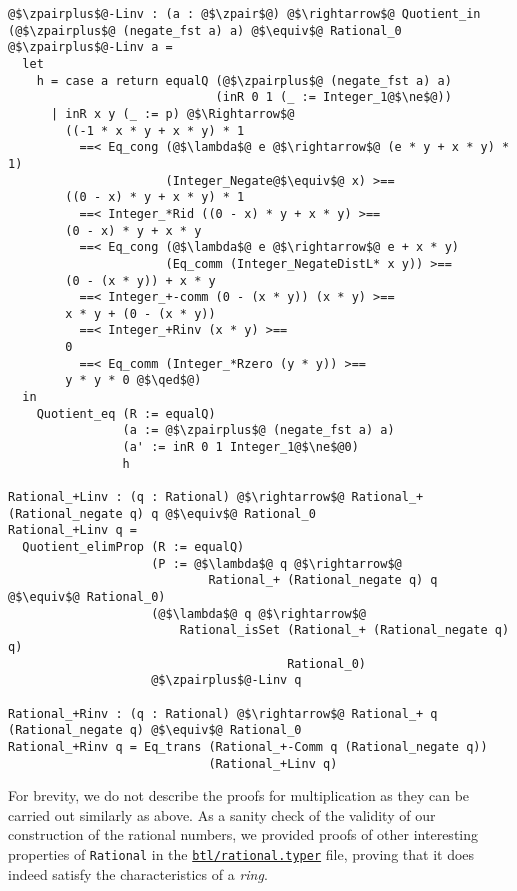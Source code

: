 \documentclass[12pt,twoside,maitrise]{dms}
\theoremstyle{definition}
\numberwithin{equation}{section}
\numberwithin{table}{chapter}
\numberwithin{figure}{chapter}
\newcommand\id[1] {\texttt{#1}}
\renewcommand\qed{\blacksquare}
\begin{document}
\begin{verbatim}
@$\zpairplus$@-Linv : (a : @$\zpair$@) @$\rightarrow$@ Quotient_in (@$\zpairplus$@ (negate_fst a) a) @$\equiv$@ Rational_0
@$\zpairplus$@-Linv a =
  let
    h = case a return equalQ (@$\zpairplus$@ (negate_fst a) a)
                             (inR 0 1 (_ := Integer_1@$\ne$@))
      | inR x y (_ := p) @$\Rightarrow$@
        ((-1 * x * y + x * y) * 1
          ==< Eq_cong (@$\lambda$@ e @$\rightarrow$@ (e * y + x * y) * 1)
                      (Integer_Negate@$\equiv$@ x) >==
        ((0 - x) * y + x * y) * 1
          ==< Integer_*Rid ((0 - x) * y + x * y) >==
        (0 - x) * y + x * y
          ==< Eq_cong (@$\lambda$@ e @$\rightarrow$@ e + x * y)
                      (Eq_comm (Integer_NegateDistL* x y)) >==
        (0 - (x * y)) + x * y
          ==< Integer_+-comm (0 - (x * y)) (x * y) >==
        x * y + (0 - (x * y))
          ==< Integer_+Rinv (x * y) >==
        0
          ==< Eq_comm (Integer_*Rzero (y * y)) >==
        y * y * 0 @$\qed$@)
  in
    Quotient_eq (R := equalQ)
                (a := @$\zpairplus$@ (negate_fst a) a)
                (a' := inR 0 1 Integer_1@$\ne$@0)
                h

Rational_+Linv : (q : Rational) @$\rightarrow$@ Rational_+ (Rational_negate q) q @$\equiv$@ Rational_0
Rational_+Linv q =
  Quotient_elimProp (R := equalQ)
                    (P := @$\lambda$@ q @$\rightarrow$@
                            Rational_+ (Rational_negate q) q @$\equiv$@ Rational_0)
                    (@$\lambda$@ q @$\rightarrow$@
                        Rational_isSet (Rational_+ (Rational_negate q) q)
                                       Rational_0)
                    @$\zpairplus$@-Linv q

Rational_+Rinv : (q : Rational) @$\rightarrow$@ Rational_+ q (Rational_negate q) @$\equiv$@ Rational_0
Rational_+Rinv q = Eq_trans (Rational_+-Comm q (Rational_negate q))
                            (Rational_+Linv q)

\end{verbatim}

For brevity, we do not describe the proofs for multiplication as they can be
carried out similarly as above. As a sanity check of the validity of our
construction of the rational numbers, we provided proofs of other interesting
properties of \id{Rational} in the
\href{https://gitlab.com/jamestjw/typer/-/blob/quot-types-v1.0.0/btl/rational.typer}{\id{btl/rational.typer}}
file, proving that it does indeed satisfy the characteristics of a \emph{ring}.
\end{document}
